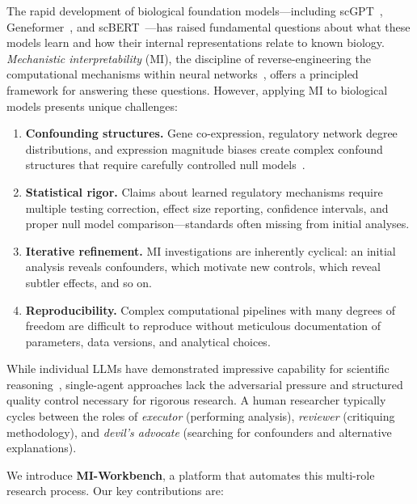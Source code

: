 \documentclass[10pt]{article}
\begin{document}
The rapid development of biological foundation models---including scGPT~\citep{cui2024scgpt}, Geneformer~\citep{theodoris2023transfer}, and scBERT~\citep{yang2022scbert}---has raised fundamental questions about what these models learn and how their internal representations relate to known biology. \emph{Mechanistic interpretability} (MI), the discipline of reverse-engineering the computational mechanisms within neural networks~\citep{olah2020zoom,elhage2022toy,conmy2023towards}, offers a principled framework for answering these questions. However, applying MI to biological models presents unique challenges:

\begin{enumerate}
  \item \textbf{Confounding structures.} Gene co-expression, regulatory network degree distributions, and expression magnitude biases create complex confound structures that require carefully controlled null models~\citep{pratapa2020benchmarking}.
  \item \textbf{Statistical rigor.} Claims about learned regulatory mechanisms require multiple testing correction, effect size reporting, confidence intervals, and proper null model comparison---standards often missing from initial analyses.
  \item \textbf{Iterative refinement.} MI investigations are inherently cyclical: an initial analysis reveals confounders, which motivate new controls, which reveal subtler effects, and so on.
  \item \textbf{Reproducibility.} Complex computational pipelines with many degrees of freedom are difficult to reproduce without meticulous documentation of parameters, data versions, and analytical choices.
\end{enumerate}

While individual LLMs have demonstrated impressive capability for scientific reasoning~\citep{romera2024mathematical,boiko2023autonomous}, single-agent approaches lack the adversarial pressure and structured quality control necessary for rigorous research. A human researcher typically cycles between the roles of \emph{executor} (performing analysis), \emph{reviewer} (critiquing methodology), and \emph{devil's advocate} (searching for confounders and alternative explanations).

We introduce \textbf{MI-Workbench}, a platform that automates this multi-role research process. Our key contributions are:
\end{document}
